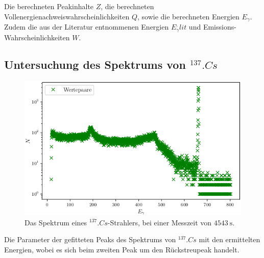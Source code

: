 \begin{table}
	\centering
	\caption{Die berechneten Peakinhalte $Z$, die berechneten Vollenergienachweiswahrscheinlichkeiten $Q$, sowie die berechneten Energien $E_\gamma$. Zudem die aus der Literatur entnommenen Energien $E_\gamma^.{lit}$ und Emissions-Wahrscheinlichkeiten $W$.}
	
	\label{tab:Q}
\end{table}

\subsection{Untersuchung des Spektrums von $^{137}.{Cs}$}

\begin{figure}
	\centering
	\includegraphics[width=\linewidth-70pt,height=\textheight-70pt,keepaspectratio]{content/images/Cs137.png}
	\caption{Das Spektrum eines $^{137}.{Cs}$-Strahlers, bei einer Messzeit von $\SI{4543}{\second}$.}
	\label{fig:SpektrumCs}
\end{figure}

\begin{table}
	\centering
	\caption{Die Parameter der gefitteten Peaks des Spektrums von $^{137}.{Cs}$ mit den ermittelten Energien, wobei es sich beim zweiten Peak um den Rückstreupeak handelt.}
	
	\label{tab:parameterCs}
\end{table}

